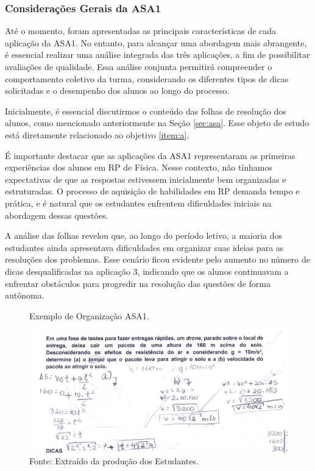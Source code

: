 \subsubsection{Considerações Gerais da ASA1} \label{subsubsec:asa1}

Até o momento, foram apresentadas as principais características de cada aplicação da ASA1. No entanto, para alcançar uma abordagem mais abrangente, é essencial realizar uma análise integrada das três aplicações, a fim de possibilitar avaliações de qualidade. Essa análise conjunta permitirá compreender o comportamento coletivo da turma, considerando os diferentes tipos de dicas solicitadas e o desempenho dos alunos ao longo do processo.

Inicialmente, é essencial discutirmos o conteúdo das folhas de resolução dos alunos, como mencionado anteriormente na Seção \ref{sec:asa}. Esse objeto de estudo está diretamente relacionado ao objetivo \ref{item:a}.

É importante destacar que as aplicações da ASA1 representaram as primeiras experiências dos alunos em RP de Física. Nesse contexto, não tínhamos expectativas de que as respostas estivessem inicialmente bem organizadas e estruturadas. O processo de aquisição de habilidades em RP demanda tempo e prática, e é natural que os estudantes enfrentem dificuldades iniciais na abordagem dessas questões.

A análise das folhas revelou que, ao longo do período letivo, a maioria dos estudantes ainda apresentava dificuldades em organizar suas ideias para as resoluções dos problemas. Esse cenário ficou evidente pelo aumento no número de dicas desqualificadas na aplicação 3, indicando que os alunos continuavam a enfrentar obstáculos para progredir na resolução das questões de forma autônoma.

\begin{figure}
    \centering
    \caption{Exemplo de Organização ASA1.}
    \includegraphics[width=1\textwidth]{fig/orgasa1.png}
    \caption*{Fonte: Extraído da produção dos Estudantes.}
    \label{fig:orgasa1}
\end{figure}

